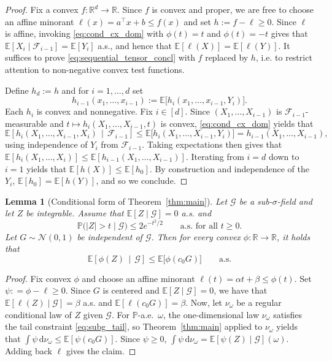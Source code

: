 \documentclass[11pt]{article}
\newcommand{\R}{\mathbb{R}}
\newcommand{\Pbb}{\mathbb{P}}
\newcommand{\Ebb}{\mathbb{E}}
\newcommand{\cN}{\mathcal{N}}
\newtheorem{lemma}[theorem]{Lemma}
\begin{document}
\begin{proof}
Fix a convex $f: \R^d \to \R$. Since $f$ is convex and proper, we are free to choose an affine minorant $\ell(x) = a^\top x + b \le f(x)$ and set $h := f - \ell \ge 0$.
Since $\ell$ is affine, invoking \eqref{eq:cond_cx_dom} with $\phi(t) = t$ and $\phi(t) = -t$ gives that
$\Ebb [X_i \mid \mathcal F_{i-1}] = \Ebb [Y_i]$ a.s., and hence that $\Ebb [\ell(X)] = \Ebb[ \ell (Y)]$.
It suffices to prove \eqref{eq:sequential_tensor_concl} with $f$ replaced by $h$, i.e. to restrict attention to non-negative convex test functions.

Define $h_d := h$ and for $i = 1, \dots, d$ set
%
\[
h_{i-1} (x_1, \dots, x_{i-1})
:= \Ebb \big[ h_i (x_1, \dots, x_{i-1}, Y_i)\big].
\]
%
Each $h_i$ is convex and nonnegative.
Fix $i \in [d]$. Since $(X_1, \dots, X_{i-1})$ is $\mathcal F_{i-1}$-measurable and $t \mapsto h_i (X_1, \dots, X_{i-1}, t)$ is convex, \eqref{eq:cond_cx_dom} yields that
%
\[
\Ebb\! \left[ h_i (X_1, \dots, X_{i-1}, X_i) \, \middle| \, \mathcal F_{i-1} \right]
\le \Ebb \big[ h_i (X_1, \dots, X_{i-1}, Y_i) \big]
= h_{i-1} (X_1, \dots, X_{i-1}),
\]
%
using independence of $Y_i$ from $\mathcal F_{i-1}$.
Taking expectations then gives that
$\Ebb [ h_i (X_1, \dots, X_i)] \le \Ebb[ h_{i-1} (X_1, \dots, X_{i-1})]$.
Iterating from $i = d$ down to $i = 1$ yields that $\Ebb [h (X)] \le \Ebb[h_0]$. 
By construction and independence of the $Y_i$, $\Ebb[h_0]=\Ebb[h(Y)]$, and so we conclude.
\end{proof}

\begin{lemma}[Conditional form of Theorem~\ref{thm:main}]
\label{lem:conditional_thm_main}
Let $\mathcal G$ be a sub-$\sigma$-field and let $Z$ be integrable.
Assume that $\Ebb[ Z \mid \mathcal G]=0$ a.s. and
%
\[
\Pbb \big( |Z| > t \mid \mathcal G \big) \le 2e^{-t^2/2}
\qquad \text{a.s. for all } t \ge 0.
\]
%
Let $G \sim \cN(0,1)$ be independent of $\mathcal G$.
Then for every convex $\phi : \R \to \R$, it holds that
%
\[
\Ebb\! \left[ \phi (Z) \, \middle| \, \mathcal G \right] \le \Ebb \big[ \phi (c_0 G) \big]
\qquad \text{a.s.}
\]
%
\end{lemma}

\begin{proof}
Fix convex $\phi$ and choose an affine minorant $\ell(t) = \alpha t + \beta \le \phi(t)$.
Set $\psi: = \phi - \ell \ge 0$.
Since $G$ is centered and $\Ebb[Z \mid \mathcal G] = 0$, we have that $\Ebb[ \ell (Z) \mid \mathcal G] = \beta$ a.s. and $\Ebb [ \ell (c_0G)] = \beta$.
Now, let $\nu_\omega$ be a regular conditional law of $Z$ given $\mathcal G$.
For $\Pbb$-a.e.\ $\omega$, the one-dimensional law $\nu_\omega$ satisfies the tail constraint \eqref{eq:subg_tail}, so
Theorem~\ref{thm:main} applied to $\nu_\omega$ yields that
$\int \psi\, \mathrm{d}\nu_\omega \le \Ebb [ \psi (c_0 G)]$.
Since $\psi \ge 0$, $\int \psi \, \mathrm{d}\nu_\omega = \Ebb[\psi(Z) \mid \mathcal G](\omega)$.
Adding back $\ell$ gives the claim.
\end{proof}
\end{document}

